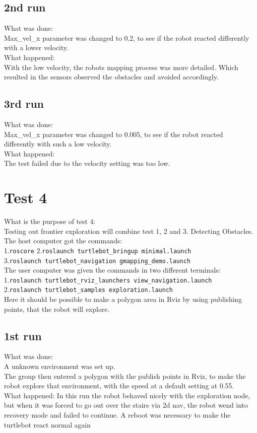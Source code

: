 \subsection{2nd run}
What was done:\\
Max\_vel\_x parameter was changed to 0.2, to see if the robot reacted differently with a lower velocity.\\
What happened:\\
With the low velocity, the robots mapping process was more detailed. Which resulted in the sensors observed the obstacles and avoided accordingly.

\subsection{3rd run}
What was done:\\
Max\_vel\_x parameter was changed to 0.005, to see if the robot reacted differently with such a low velocity.\\
What happened:\\
The test failed due to the velocity setting was too low.

%
%

\section{Test 4} 
What is the purpose of test 4:\\
Testing out frontier exploration will combine test 1, 2 and 3. Detecting Obstacles.\\ 
The host computer got the commands:\\
1.\texttt{roscore} 
2.\texttt{roslaunch turtlebot\_bringup minimal.launch}\\
3.\texttt{roslaunch turtlebot\_navigation gmapping\_demo.launch}\\
The user computer was given the commands in two different terminals:\\
1.\texttt{roslaunch turtlebot\_rviz\_launchers view\_navigation.launch}\\
2.\texttt{roslaunch turtlebot\_samples exploration.launch}\\
Here it should be possible to make a polygon area in Rviz by using publishing points, that the robot will explore.

\subsection{1st run}
What was done:\\
A unknown environment was set up.\\ 
The group then entered a polygon with the publish points in Rviz, to make the robot explore that environment, with the speed at a default setting at 0.55.\\
What happened:
In this run the robot behaved nicely with the exploration node, but when it was forced to go out over the stairs via 2d nav, the robot wend into recovery mode and failed to continue. A reboot was necessary to make the turtlebot react normal again


